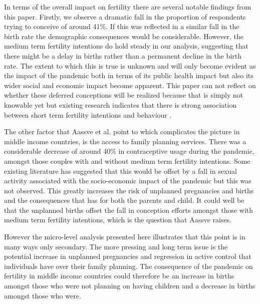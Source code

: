 \documentclass[10pt,letterpaper]{article}
\begin{document}
In terms of the overall impact on fertility there are several notable findings from this paper. Firstly, we observe a dramatic fall in the proportion of respondents trying to conceive of around 41\%. If this was reflected in a similar fall in the birth rate the demographic consequences would be considerable. However, the medium term fertility intentions do hold steady in our analysis, suggesting that there might be a delay in births rather than a permanent decline in the birth rate. The extent to which this is true is unknown and will only become evident as the impact of the pandemic both in terms of its public health impact but also its wider social and economic impact become apparent. This paper can not reflect on whether these deferred conceptions will be realized because that is simply not knowable yet but existing research indicates that there is strong association between short term fertility intentions and behaviour \cite{dommermuth2015realization}. 

The other factor that Aassve et al. point to which complicates the picture in middle income countries, is the access to family planning services. There was a considerable decrease of around 40\% in contraceptive usage during the pandemic, amongst those couples with and without medium term fertility intentions. Some existing literature has suggested that this would be offset by a fall in sexual activity associated with the socio-economic impact of the pandemic but this was not observed. This greatly increases the risk of unplanned pregnancies and births and the consequences that has for both the parents and child. It could well be that the unplanned births offset the fall in conception efforts amongst those with medium term fertility intentions, which is the question that Aassve raises. 

However the micro-level analysis presented here illustrates that this point is in many ways only secondary. The more pressing and long term issue is the potential increase in unplanned pregnancies and regression in active control that individuals have over their family planning. The consequence of the pandemic on fertility in middle income countries could therefore be an increase in births amongst those who were not planning on having children and a decrease in births amongst those who were. 
\end{document}

